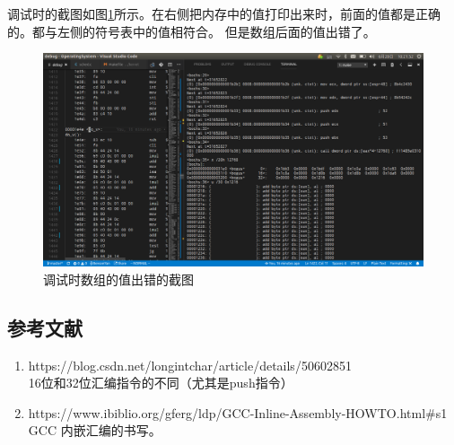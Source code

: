 \documentclass[a4paper]{article}
\begin{document}
    调试时的截图如图\ref{fig:error}所示。在右侧把内存中的值打印出来时，前面的值都是正确的。都与左侧的符号表中的值相符合。
    但是数组后面的值出错了。

    
    
    \begin{figure}[!hbt]
        \begin{center}
        \includegraphics[scale=0.3]{assets/error.png}
        \caption{调试时数组的值出错的截图\label{fig:error}} 
        \end{center} 
    \end{figure} 
    
\begin{appendices}
\section{参考文献} \label{sec:reference}
\begin{enumerate}
    \item https://blog.csdn.net/longintchar/article/details/50602851 \\
    16位和32位汇编指令的不同（尤其是push指令）
    \item https://www.ibiblio.org/gferg/ldp/GCC-Inline-Assembly-HOWTO.html\#s1 \\
    GCC 内嵌汇编的书写。
  \end{enumerate}
\end{appendices}
\end{document}
